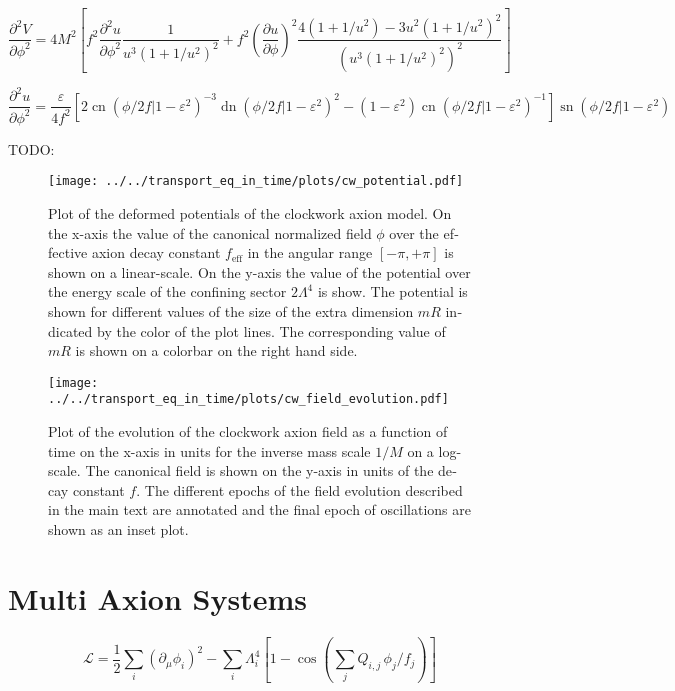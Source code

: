 \documentclass[master,       %
               twoside,        %
               BCOR10mm,       %
               english,ngerman, %
               ]{GAUBM}
\begin{document}
\begin{otherlanguage}{english}
\begin{equation}
	\frac{\partial^2 V}{\partial \phi^2} = 4 M^2 \left[ f^2 \frac{\partial^2 u}{\partial \phi^2} \frac{1}{u^3(1 + 1/u^2)^2} + f^2 \left( \frac{\partial u}{\partial \phi} \right)^2 \frac{4(1 + 1/u^2) - 3u^2(1 + 1/u^2)^2}{\left( u^3(1 + 1/u^2)^2 \right)^2} \right]
\end{equation}

\begin{equation}
	\frac{\partial^2 u}{\partial \phi^2} = \frac{\varepsilon}{4 f^2} \left[ 2 \operatorname{cn}(\phi/2f|1 - \varepsilon^2)^{-3} \operatorname{dn}(\phi/2f|1 - \varepsilon^2)^2 - (1 - \varepsilon^2) \operatorname{cn}(\phi/2f|1 - \varepsilon^2)^{-1} \right] \operatorname{sn}(\phi/2f|1 - \varepsilon^2)
\end{equation}


TODO: 


\begin{figure}[h]
    \texttt{[image: ../../transport\_eq\_in\_time/plots/cw\_potential.pdf]}
    \caption{Plot of the deformed potentials of the clockwork axion model. On the x-axis the value of the canonical normalized field $\phi$ over the effective axion decay constant $f_\mathrm{eff}$ in the angular range $[-\pi, +\pi]$ is shown on a linear-scale. On the y-axis the value of the potential over the energy scale of the confining sector $2 \Lambda^4$ is show. The potential is shown for different values of the size of the extra dimension $mR$ indicated by the color of the plot lines. The corresponding value of $mR$ is shown on a colorbar on the right hand side.}
\end{figure}

\begin{figure}[h]
    \texttt{[image: ../../transport\_eq\_in\_time/plots/cw\_field\_evolution.pdf]}
    \caption{Plot of the evolution of the clockwork axion field as a function of time on the x-axis in units for the inverse mass scale $1/M$ on a log-scale. The canonical field is shown on the y-axis in units of the decay constant $f$. The different epochs of the field evolution described in the main text are annotated and the final epoch of oscillations are shown as an inset plot.}
\end{figure}


\section{Multi Axion Systems}

\begin{equation}
	\mathcal{L} = \frac{1}{2} \sum_i \left( \partial_\mu \phi_i \right)^2 - \sum_i \Lambda_i^4 \left[ 1 - \cos \left( \sum_j Q_{i,j} \, \phi_j / f_j \right) \right] 
\end{equation}


\end{otherlanguage}
\end{document}
